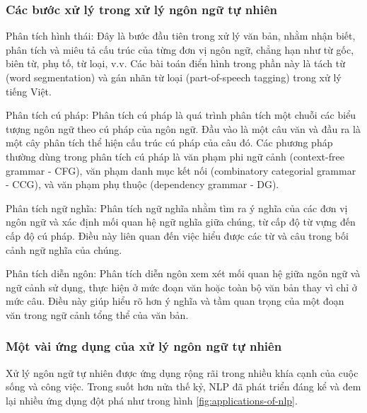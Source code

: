 \subsubsection{Các bước xử lý trong xử lý ngôn ngữ tự nhiên}

Phân tích hình thái: Đây là bước đầu tiên trong xử lý văn bản, nhằm nhận biết, phân tích và miêu tả cấu trúc của từng đơn vị ngôn ngữ, chẳng hạn như từ gốc, biên từ, phụ tố, từ loại, v.v. Các bài toán điển hình trong phần này là tách từ (word segmentation) và gán nhãn từ loại (part-of-speech tagging) trong xử lý tiếng Việt.

Phân tích cú pháp: Phân tích cú pháp là quá trình phân tích một chuỗi các biểu tượng ngôn ngữ theo cú pháp của ngôn ngữ. Đầu vào là một câu văn và đầu ra là một cây phân tích thể hiện cấu trúc cú pháp của câu đó. Các phương pháp thường dùng trong phân tích cú pháp là văn phạm phi ngữ cảnh (context-free grammar - CFG), văn phạm danh mục kết nối (combinatory categorial grammar - CCG), và văn phạm phụ thuộc (dependency grammar - DG).

Phân tích ngữ nghĩa: Phân tích ngữ nghĩa nhằm tìm ra ý nghĩa của các đơn vị ngôn ngữ và xác định mối quan hệ ngữ nghĩa giữa chúng, từ cấp độ từ vựng đến cấp độ cú pháp. Điều này liên quan đến việc hiểu được các từ và câu trong bối cảnh ngữ nghĩa của chúng.

Phân tích diễn ngôn: Phân tích diễn ngôn xem xét mối quan hệ giữa ngôn ngữ và ngữ cảnh sử dụng, thực hiện ở mức đoạn văn hoặc toàn bộ văn bản thay vì chỉ ở mức câu. Điều này giúp hiểu rõ hơn ý nghĩa và tầm quan trọng của một đoạn văn trong ngữ cảnh tổng thể của văn bản.

\subsubsection{Một vài ứng dụng của xử lý ngôn ngữ tự nhiên}

Xử lý ngôn ngữ tự nhiên được ứng dụng rộng rãi trong nhiều khía cạnh của cuộc sống và công việc. Trong suốt hơn nửa thế kỷ, NLP đã phát triển đáng kể và đem lại nhiều ứng dụng đột phá như trong hình \ref{fig:applications-of-nlp}.

